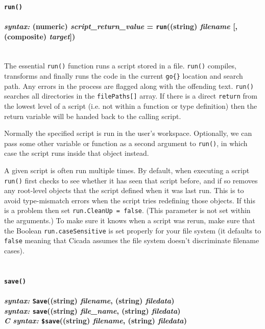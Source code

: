 \documentclass{article}
\begin{document}




\paragraph{\texttt{run()}\\\\
\normalfont \emph{syntax: } (numeric) \emph{script\_return\_value} = \texttt{run}((string) \emph{filename} [, (composite) \emph{target}])\\\\}

The essential \texttt{run()} function runs a script stored in a file.  \texttt{run()} compiles, transforms and finally runs the code in the current \verb#go{}# location and search path.  Any errors in the process are flagged along with the offending text.  \texttt{run()} searches all directories in the \texttt{filePaths[]} array.  If there is a direct \verb#return# from the lowest level of a script (i.e. not within a function or type definition) then the return variable will be handed back to the calling script.

Normally the specified script is run in the user's workspace.  Optionally, we can pass some other variable or function as a second argument to \texttt{run()}, in which case the script runs inside that object instead.

A given script is often run multiple times.  By default, when executing a script \verb#run()# first checks to see whether it has seen that script before, and if so removes any root-level objects that the script defined when it was last run.  This is to avoid type-mismatch errors when the script tries redefining those objects.  If this is a problem then set \verb#run.CleanUp = false#.  (This parameter is not set within the arguments.)  To make sure it knows when a script was rerun, make sure that the Boolean \verb#run.caseSensitive# is set properly for your file system (it defaults to \verb#false# meaning that Cicada assumes the file system doesn't discriminate filename cases).\\\\





\paragraph{\texttt{save()}\\\\
\normalfont \emph{syntax: } \texttt{Save}((string) \emph{filename}, (string) \emph{filedata})\\
\normalfont \emph{syntax: } \texttt{save}((string) \emph{file\_name}, (string) \emph{filedata})\\
\normalfont \emph{C syntax: } \texttt{\$save}((string) \emph{filename}, (string) \emph{filedata})\\\\}
 
\end{document}
